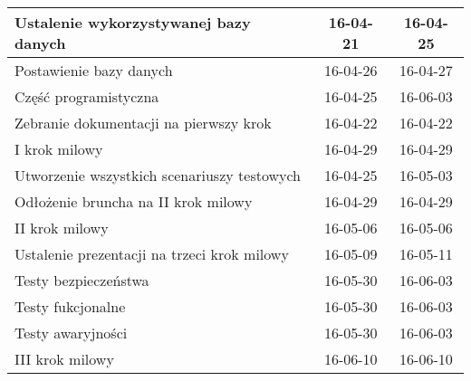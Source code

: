 \begin{table}[!h]
\begin{center}
\begin{tabular}{ p{8cm} || c | c }
Ustalenie wykorzystywanej bazy danych & 16-04-21 & 16-04-25 \\ \hline
Postawienie bazy danych & 16-04-26 & 16-04-27 \\ \hline
Część programistyczna & 16-04-25 & 16-06-03 \\ \hline
Zebranie dokumentacji na pierwszy krok & 16-04-22 & 16-04-22 \\ \hline
I krok milowy & 16-04-29 & 16-04-29 \\ \hline
Utworzenie wszystkich scenariuszy testowych & 16-04-25 & 16-05-03 \\ \hline
Odłożenie bruncha na II krok milowy & 16-04-29 & 16-04-29 \\ \hline
II krok milowy & 16-05-06 & 16-05-06 \\ \hline
Ustalenie prezentacji na trzeci krok milowy & 16-05-09 & 16-05-11 \\ \hline
Testy bezpieczeństwa & 16-05-30 & 16-06-03 \\ \hline
Testy fukcjonalne & 16-05-30 & 16-06-03 \\ \hline
Testy awaryjności & 16-05-30 & 16-06-03 \\ \hline
III krok milowy & 16-06-10 & 16-06-10 \\
  \end{tabular} 
  \end{center}
\end{table}